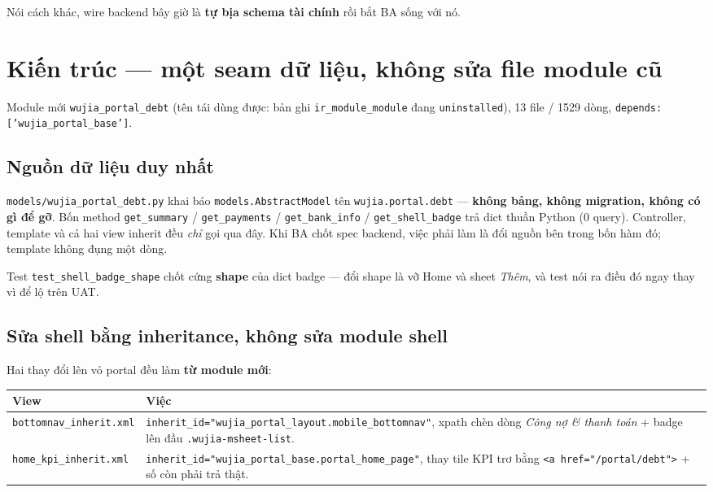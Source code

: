 Nói cách khác, wire backend bây giờ là \textbf{tự bịa schema tài chính} rồi bắt BA sống với nó.

\section{Kiến trúc --- một seam dữ liệu, không sửa file module cũ}

Module mới \texttt{wujia\_portal\_debt} (tên tái dùng được: bản ghi
\texttt{ir\_module\_module} đang \texttt{uninstalled}), 13 file / 1529 dòng, \texttt{depends:
['wujia\_portal\_base']}.

\subsection{Nguồn dữ liệu duy nhất}

\texttt{models/wujia\_portal\_debt.py} khai báo \texttt{models.AbstractModel} tên
\texttt{wujia.portal.debt} --- \textbf{không bảng, không migration, không có gì để gỡ}. Bốn method
\texttt{get\_summary} / \texttt{get\_payments} / \texttt{get\_bank\_info} / \texttt{get\_shell\_badge}
trả dict thuần Python (0 query). Controller, template và cả hai view inherit đều \emph{chỉ} gọi qua
đây. Khi BA chốt spec backend, việc phải làm là đổi nguồn bên trong bốn hàm đó; template không đụng
một dòng.

Test \texttt{test\_shell\_badge\_shape} chốt cứng \textbf{shape} của dict badge --- đổi shape là vỡ
Home và sheet \emph{Thêm}, và test nói ra điều đó ngay thay vì để lộ trên UAT.

\subsection{Sửa shell bằng inheritance, không sửa module shell}

Hai thay đổi lên vỏ portal đều làm \textbf{từ module mới}:

\begin{center}
\begin{tabular}{p{4.9cm}p{8.9cm}}
\hline
\textbf{View} & \textbf{Việc} \\
\hline
\texttt{bottomnav\_inherit.xml} & \texttt{inherit\_id="wujia\_portal\_layout.mobile\_bottomnav"},
xpath chèn dòng \emph{Công nợ \& thanh toán} + badge lên đầu \texttt{.wujia-msheet-list}. \\
\texttt{home\_kpi\_inherit.xml} & \texttt{inherit\_id="wujia\_portal\_base.portal\_home\_page"},
thay tile KPI trơ bằng \texttt{<a href="/portal/debt">} + số còn phải trả thật. \\
\hline
\end{tabular}
\end{center}

